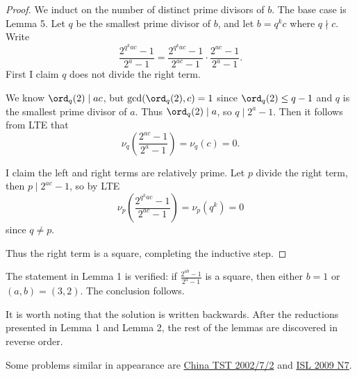\begin{proof}
    We induct on the number of distinct prime divisors of $b$. The base case is Lemma 5. Let $q$ be the smallest prime divisor of $b$, and let $b=q^kc$ where $q\nmid c$. Write \[\frac{2^{q^kac}-1}{2^a-1}=\frac{2^{q^kac}-1}{2^{ac}-1}\cdot\frac{2^{ac}-1}{2^a-1}.\]
    First I claim $q$ does not divide the right term.

    We know $\ord_q(2)\mid ac$, but $\gcd(\ord_q(2),c)=1$ since $\ord_q(2)\le q-1$ and $q$ is the smallest prime divisor of $a$. Thus $\ord_q(2)\mid a$, so $q\mid2^a-1$. Then it follows from LTE that \[\nu_q\left(\frac{2^{ac}-1}{2^a-1}\right)=\nu_q(c)=0.\]

    I claim the left and right terms are relatively prime. Let $p$ divide the right term, then $p\mid2^{ac}-1$, so by LTE \[\nu_p\left(\frac{2^{q^kac}-1}{2^{ac}-1}\right)=\nu_p\left(q^k\right)=0\]
    since $q\ne p$.

    Thus the right term is a square, completing the inductive step.
\end{proof}

The statement in Lemma 1 is verified: if $\tfrac{2^{ab}-1}{2^a-1}$ is a square, then either $b=1$ or $(a,b)=(3,2)$. The conclusion follows.
\begin{remark}
    It is worth noting that the solution is written backwards. After the reductions presented in Lemma 1 and Lemma 2, the rest of the lemmas are discovered in reverse order.
\end{remark}
\begin{remark}
    Some problems similar in appearance are \href{https://artofproblemsolving.com/community/c6h254153p1389586}{China TST 2002/7/2} and \href{https://artofproblemsolving.com/community/c6h355801p1932947}{ISL 2009 N7}.
\end{remark}
